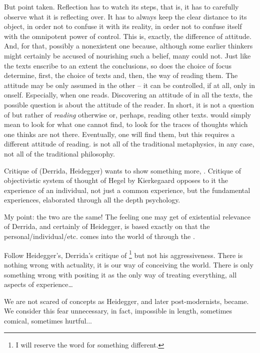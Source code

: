 {\pa
But point taken. Reflection has to watch its steps, that is, it has to 
carefully observe what it is reflecting over. It has to always keep 
the clear distance to its object, in order not to confuse it with its 
reality, in order not to confuse itself with the omnipotent power of 
control. This is, exactly, the difference of attitude. And, for that, 
possibly a nonexistent one because, although some earlier thinkers might 
certainly be accused of nourishing such a belief, many could not. 
Just like the texts enscribe to an extent the conclusions, so does the 
choice of focus determine, first, the choice of texts and, then, the way 
of reading them. The attitude may be only assumed in the other -- it 
can be controlled, if at all, only in onself. Especially, when one 
reads. Discovering an attitude of  in 
all the texts, the possible question is about the attitude of the 
reader. 
In short, it is not a question of  but rather of {\em reading} otherwise or, perhaps, reading 
other texts.  would simply mean to look for what 
one cannot find, to look for the traces of thoughts which one thinks 
are not there. Eventually, one will find them, but this requires a 
different attitude of reading.
 is not all of the traditional metaphysics, in any case, 
not all of the traditional philosophy.


\pa
Critique of  (Derrida, Heidegger) wants 
to show something more, . Critique of objectivistic 
system of thought of Hegel by Kierkegaard opposes to it the experience 
of an individual, not just a common experience, but the fundamental 
experiences, elaborated through all the depth psychology. 

My point: the two are the same! The feeling one may get of 
existential relevance of Derrida, and certainly of Heidegger, is 
based exactly on that the personal/individual/etc. comes into the 
world of  through the . 


\pa
Follow Heidegger's, Derrida's critique of \footnote{I will reserve the word  for 
something different.} but not his aggressiveness. There is nothing 
wrong with actuality, it is our way of conceiving the world. There is 
only something wrong with positing it as the only way of treating 
everything, all aspects of experience\ldots 

We are not scared of concepts as Heidegger, and later post-modernists, became.
We consider this fear unnecessary, in fact, impossible in length, sometimes
comical, sometimes hurtful...

}
